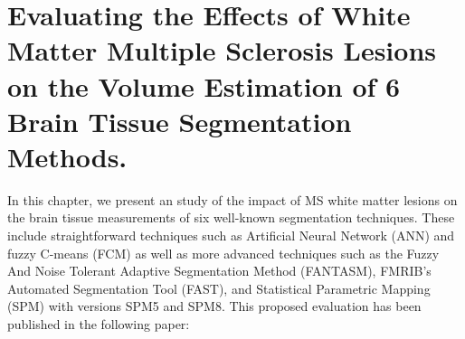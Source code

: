 
\chapter{Evaluating the Effects of White Matter Multiple Sclerosis Lesions on the Volume Estimation of 6 Brain Tissue Segmentation
Methods.}  
\label{chapter:chapter_3}
In this chapter, we present an study of the impact of MS white matter lesions on the brain tissue measurements of six well-known segmentation techniques. These include straightforward techniques such as Artificial Neural Network (ANN) and fuzzy C-means (FCM) as well as more advanced techniques such as the Fuzzy And Noise Tolerant Adaptive Segmentation Method (FANTASM), FMRIB's Automated Segmentation Tool (FAST), and Statistical Parametric Mapping (SPM) with versions SPM5 and SPM8. This proposed evaluation has been published in the following paper:

\vspace{2cm}

\noindent{}






